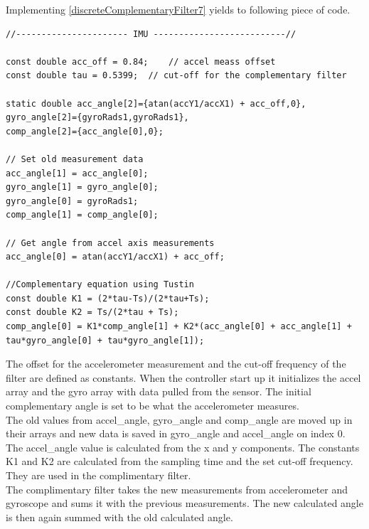 Implementing \eqref{discreteComplementaryFilter7} yields to following piece of code. 

\begin{lstlisting}[caption  = {Code for the implementation of the complementary filter in C\texttt{++}. The comp\_angle[0] is the newest found angle of the frame.},
label    = codeCompFilter ]
//---------------------- IMU --------------------------//

const double acc_off = 0.84;  	// accel meass offset
const double tau = 0.5399;	// cut-off for the complementary filter

static double acc_angle[2]={atan(accY1/accX1) + acc_off,0},
gyro_angle[2]={gyroRads1,gyroRads1},
comp_angle[2]={acc_angle[0],0};

// Set old measurement data
acc_angle[1] = acc_angle[0];
gyro_angle[1] = gyro_angle[0];
gyro_angle[0] = gyroRads1;
comp_angle[1] = comp_angle[0];

// Get angle from accel axis measurements
acc_angle[0] = atan(accY1/accX1) + acc_off;

//Complementary equation using Tustin
const double K1 = (2*tau-Ts)/(2*tau+Ts);
const double K2 = Ts/(2*tau + Ts);
comp_angle[0] = K1*comp_angle[1] + K2*(acc_angle[0] + acc_angle[1] + tau*gyro_angle[0] + tau*gyro_angle[1]);
\end{lstlisting}
The offset for the accelerometer measurement and the cut-off frequency of the filter are defined as constants. When the controller start up it initializes the accel array and the gyro array with data pulled from the sensor. The initial complementary angle is set to be what the accelerometer measures.\\
The old values from accel\_angle, gyro\_angle and comp\_angle are moved up in their arrays and new data is saved in gyro\_angle and accel\_angle on index 0. The accel\_angle value is calculated from the x and y components.
The constants K1 and K2 are calculated from the sampling time and the set cut-off frequency. They are used in the complimentary filter.\\
The complimentary filter takes the new measurements from accelerometer and gyroscope and sums it with the previous measurements. The new calculated angle is then again summed with the old calculated angle.

